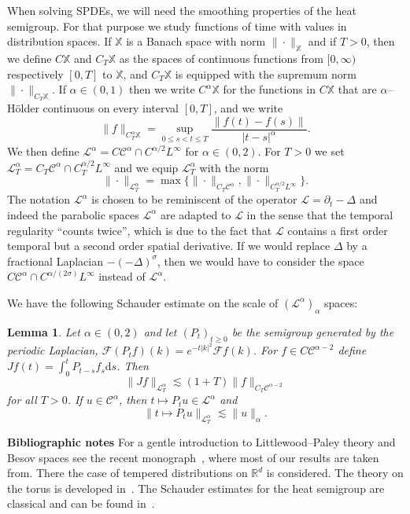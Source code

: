 \documentclass[a4paper,11pt]{article}
\newcommand{\cdummy}{\cdot}
\newcommand{\mathd}{\mathrm{d}}
\newcommand{\nosymbol}{}
\newcommand{\tmtextbf}[1]{{\bfseries{#1}}}
\newtheorem{lemma}{Lemma}
{\theorembodyfont{\rmfamily}\newtheorem{remark}{Remark}}
\newcommand{\LL}{\mathscr{L}}
\newcommand{\CF}{\mathscr{F}}
\newcommand{\CC}{\mathscr{C}}
\begin{document}
When solving SPDEs, we will need the smoothing properties of the heat
semigroup. For that purpose we study functions of time with values in
distribution spaces. If $\mathbb{X}$ is a Banach space with norm $\| \cdummy
\|_{\mathbb{X}}$ and if $T > 0$, then we define $C\mathbb{X}$ and $C_T
\mathbb{X}$ as the spaces of continuous functions from $[0, \infty)$
respectively $[0, T]$ to $\mathbb{X}$, and $C_T \mathbb{X}$ is equipped with
the supremum norm $\| \nosymbol \cdummy \|_{C_T \mathbb{X}}$. If $\alpha \in
(0, 1)$ then we write $C^{\alpha} \mathbb{X}$ for the functions in
$C\mathbb{X}$ that are $\alpha$--H{\"o}lder continuous on every interval $[0,
T]$, and we write
\[ \| f \|_{C^{\alpha}_T \mathbb{X}} = \sup_{0 \leqslant s < t \leqslant T}
   \frac{\| f (t) - f (s) \|}{| t - s |^{\alpha}} . \]
We then define $\LL^{\alpha} = C \CC^{\alpha} \cap C^{\alpha / 2} L^{\infty}$
for $\alpha \in (0, 2)$. For $T > 0$ we set $\LL^{\alpha}_T = C_T \CC^{\alpha}
\cap C^{\alpha / 2}_T L^{\infty}$ and we equip $\LL^{\alpha}_T$ with the norm
\[ \| \cdummy \|_{\LL^{\alpha}_T} = \max \{ \| \cdummy \|_{C_T \CC^{\alpha}},
   \| \cdummy \|_{C^{\alpha / 2}_T L^{\infty}} \} . \]
The notation $\LL^{\alpha}$ is chosen to be reminiscent of the operator $\LL =
\partial_t - \Delta$ and indeed the parabolic spaces $\LL^{\alpha}$ are
adapted to $\LL$ in the sense that the temporal regularity ``counts twice'',
which is due to the fact that $\LL$ contains a first order temporal but a
second order spatial derivative. If we would replace $\Delta$ by a fractional
Laplacian $- (- \Delta)^{\sigma}$, then we would have to consider the space $C
\CC^{\alpha} \cap C^{\alpha / (2 \sigma)} L^{\infty}$ instead of
$\LL^{\alpha}$.

We have the following Schauder estimate on the scale of $\left( \LL^{\alpha}
\right)_{\alpha}$ spaces:

\begin{lemma}
  \label{lem:schauder}Let $\alpha \in (0, 2)$ and let $(P_t)_{t \geqslant 0}$
  be the semigroup generated by the periodic Laplacian, $\CF (P_t f) (k) =
  e^{- t | k |^2} \CF f (k)$. For $f \in C \CC^{\alpha - 2}$ define $J f (t) =
  \int_0^t P_{t - s} f_s \mathd s$. Then
  \[ \| J f \|_{\LL^{\alpha}_T} \lesssim (1 + T) \| f \|_{C_T \CC^{\alpha -
     2}} \]
  for all $T > 0$. If $u \in \CC^{\alpha}$, then $t \mapsto P_t u \in
  \LL^{\alpha}$ and
  \[ \| t \mapsto P_t u \|_{\LL^{\alpha}_T} \lesssim \| u \|_{\alpha} . \]
\end{lemma}

\tmtextbf{Bibliographic notes} For a gentle introduction to Littlewood--Paley
theory and Besov spaces see the recent monograph~{\cite{Bahouri2011}}, where
most of our results are taken from. There the case of tempered distributions
on $\mathbb{R}^d$ is considered. The theory on the torus is developed
in~{\cite{Schmeisser1987}}. The Schauder estimates for the heat semigroup are
classical and can be found in~{\cite{Gubinelli2012,Gubinelli2014}}.
\end{document}

